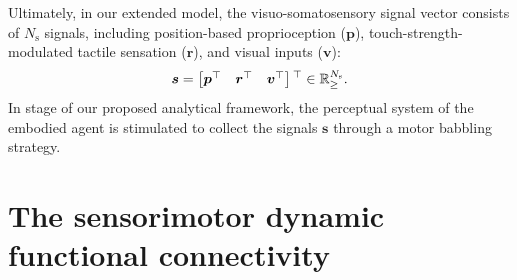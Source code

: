 Ultimately, in our extended model, the visuo-somatosensory signal vector consists of $N_\text{s}$ signals, including position-based proprioception ($\bm{p}$), touch-strength-modulated tactile sensation ($\bm{r}$), and visual inputs ($\bm{v}$):  
\begin{equation}
	\bm{s} = \begin{bmatrix}
		\bm{p}{^{\top}} & \bm{r}{^{\top}} & \bm{v}{^{\top}}
	\end{bmatrix}{^{\top}} \in \mathbb{R}^{N_\text{s}}_{\geq}.
\end{equation}
In stage  of our proposed analytical framework, the perceptual system of the embodied agent is stimulated to collect the signals $\bm{s}$ through a motor babbling strategy.

\section{The sensorimotor dynamic functional connectivity}


